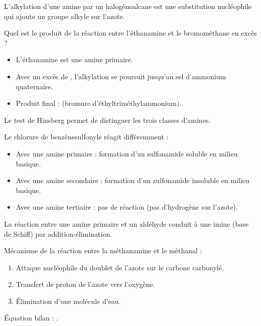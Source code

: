 L'alkylation d'une amine par un halogénoalcane est une substitution nucléophile qui ajoute un groupe alkyle sur l'azote.

\begin{exemple}
Quel est le produit de la réaction entre l'éthanamine et le bromométhane en excès ?
\begin{itemize}
    \item L'éthanamine  est une amine primaire.
    \item Avec un excès de , l'alkylation se poursuit jusqu'au sel d'ammonium quaternaire.
    \item Produit final :  (bromure d'éthyltriméthylammonium).
\end{itemize}
\end{exemple}

Le test de Hinsberg permet de distinguer les trois classes d'amines.

\begin{exemple}
Le chlorure de benzènesulfonyle  réagit différemment :
\begin{itemize}
    \item Avec une amine primaire : formation d'un sulfonamide soluble en milieu basique.
    \item Avec une amine secondaire : formation d'un sulfonamide insoluble en milieu basique.
    \item Avec une amine tertiaire : pas de réaction (pas d'hydrogène sur l'azote).
\end{itemize}
\end{exemple}

La réaction entre une amine primaire et un aldéhyde conduit à une imine (base de Schiff) par addition-élimination.

\begin{exemple}
Mécanisme de la réaction entre la méthanamine  et le méthanal  :
\begin{enumerate}
    \item Attaque nucléophile du doublet de l'azote sur le carbone carbonylé.
    \item Transfert de proton de l'azote vers l'oxygène.
    \item Élimination d'une molécule d'eau.
\end{enumerate}
Équation bilan : .
\end{exemple}


